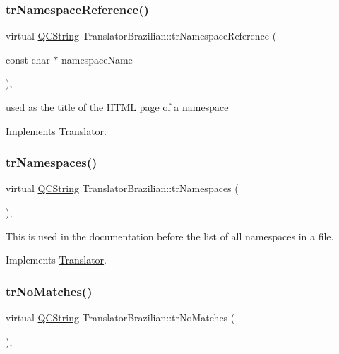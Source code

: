 \subsubsection{\texorpdfstring{trNamespaceReference()}{trNamespaceReference()}}
{\footnotesize\ttfamily virtual \mbox{\hyperlink{class_q_c_string}{Q\+C\+String}} Translator\+Brazilian\+::tr\+Namespace\+Reference (\begin{DoxyParamCaption}\item[{const char $\ast$}]{namespace\+Name }\end{DoxyParamCaption})\hspace{0.3cm}{\ttfamily [inline]}, {\ttfamily [virtual]}}

used as the title of the H\+T\+ML page of a namespace 

Implements \mbox{\hyperlink{class_translator}{Translator}}.

\mbox{\label{class_translator_brazilian_ab7249da90581ebba6ea0e3263368d5d3}} 
\subsubsection{\texorpdfstring{trNamespaces()}{trNamespaces()}}
{\footnotesize\ttfamily virtual \mbox{\hyperlink{class_q_c_string}{Q\+C\+String}} Translator\+Brazilian\+::tr\+Namespaces (\begin{DoxyParamCaption}{ }\end{DoxyParamCaption})\hspace{0.3cm}{\ttfamily [inline]}, {\ttfamily [virtual]}}

This is used in the documentation before the list of all namespaces in a file. 

Implements \mbox{\hyperlink{class_translator}{Translator}}.

\mbox{\label{class_translator_brazilian_af95289ebc78dee03bf825ae135ec4f1c}} 
\subsubsection{\texorpdfstring{trNoMatches()}{trNoMatches()}}
{\footnotesize\ttfamily virtual \mbox{\hyperlink{class_q_c_string}{Q\+C\+String}} Translator\+Brazilian\+::tr\+No\+Matches (\begin{DoxyParamCaption}{ }\end{DoxyParamCaption})\hspace{0.3cm}{\ttfamily [inline]}, {\ttfamily [virtual]}}

